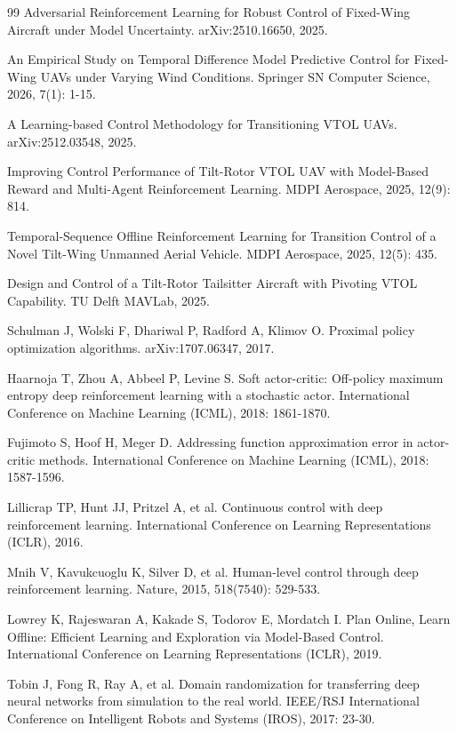 \documentclass[12pt,a4paper]{ctexart}
\begin{document}
\begin{thebibliography}{99}
 Adversarial Reinforcement Learning for Robust Control of Fixed-Wing Aircraft under Model Uncertainty. arXiv:2510.16650, 2025.

 An Empirical Study on Temporal Difference Model Predictive Control for Fixed-Wing UAVs under Varying Wind Conditions. Springer SN Computer Science, 2026, 7(1): 1-15.

 A Learning-based Control Methodology for Transitioning VTOL UAVs. arXiv:2512.03548, 2025.

 Improving Control Performance of Tilt-Rotor VTOL UAV with Model-Based Reward and Multi-Agent Reinforcement Learning. MDPI Aerospace, 2025, 12(9): 814.

 Temporal-Sequence Offline Reinforcement Learning for Transition Control of a Novel Tilt-Wing Unmanned Aerial Vehicle. MDPI Aerospace, 2025, 12(5): 435.

 Design and Control of a Tilt-Rotor Tailsitter Aircraft with Pivoting VTOL Capability. TU Delft MAVLab, 2025.

 Schulman J, Wolski F, Dhariwal P, Radford A, Klimov O. Proximal policy optimization algorithms. arXiv:1707.06347, 2017.

 Haarnoja T, Zhou A, Abbeel P, Levine S. Soft actor-critic: Off-policy maximum entropy deep reinforcement learning with a stochastic actor. International Conference on Machine Learning (ICML), 2018: 1861-1870.

 Fujimoto S, Hoof H, Meger D. Addressing function approximation error in actor-critic methods. International Conference on Machine Learning (ICML), 2018: 1587-1596.

 Lillicrap TP, Hunt JJ, Pritzel A, et al. Continuous control with deep reinforcement learning. International Conference on Learning Representations (ICLR), 2016.

 Mnih V, Kavukcuoglu K, Silver D, et al. Human-level control through deep reinforcement learning. Nature, 2015, 518(7540): 529-533.

 Lowrey K, Rajeswaran A, Kakade S, Todorov E, Mordatch I. Plan Online, Learn Offline: Efficient Learning and Exploration via Model-Based Control. International Conference on Learning Representations (ICLR), 2019.

 Tobin J, Fong R, Ray A, et al. Domain randomization for transferring deep neural networks from simulation to the real world. IEEE/RSJ International Conference on Intelligent Robots and Systems (IROS), 2017: 23-30.


\end{thebibliography}
\end{document}
